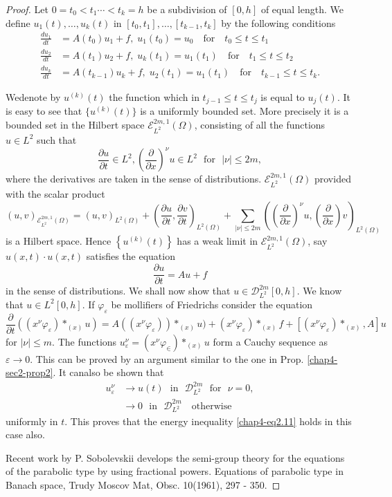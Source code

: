 \begin{proof}
Let $0 = t_0 < t_1 \cdots < t_k = h$ be a subdivision of $[0,h]$ of
equal length. We define $u_1(t), \ldots, u_k(t)$ in $[t_0, t_1],
\ldots, [t_{k-1}, t_k]$ by the following conditions  
\begin{align*}
\frac{du_1}{dt} & = A(t_0) u_1 + f, \; u_1 (t_0) = u_0 \quad \text{for}
\quad t_0 \leq t \leq t_1 \\ 
\frac{du_2}{dt} & = A(t_1) u_2 + f, \; u_k (t_{1}) = u_{1} (t_{1})
\quad \text{for} \quad  t_1 \leq t \leq t_2 \\ 
\frac{du_k}{dt} & = A(t_{k-1}) u_k + f, \; u_2 (t_{1}) = u_{1}
(t_{1})  \quad \text{for} \quad t_{k-1} \leq t \leq t_k.  
\end{align*}

We\pageoriginale denote by $u^{(k)} (t)$ the function which in
$t_{j-1} \leq t \leq t_j$ is equal to $u_j (t)$. It is easy to see that
$\{ u^{(k)} (t)\}$ is a uniformly bounded set. More precisely it is a
bounded set in the Hilbert space $\mathscr{E}^{2m, 1}_{L^2}(\Omega)$,
consisting of all the functions $u \in L^2$ such that
$$
\frac{\partial u}{\partial t} \in L^2,
\left(\frac{\partial}{\partial x}\right)^\nu u \in L^2  \text{~ for~ }
|\nu| \leq 2m,    
$$
where the derivatives are taken in the sense of
distributions. $\mathscr{E}^{2m, 1}_{L^2} (\Omega)$ provided with the
scalar product  
$$
(u, v)_{\mathscr{E}^{ 2m, 1}_{L^2}(\Omega)} = (u, v)_{L^2 (\Omega)} +
\left(\frac{\partial u}{\partial t}, \frac{\partial v}{\partial
  t}\right)_{L^2 (\Omega)} + \sum_{|\nu| \leq 2m}
\left(\left(\frac{\partial}{\partial x}\right)^\nu u,
\left(\frac{\partial}{\partial x}\right) v\right)_{L^2 (\Omega)}  
$$
is a Hilbert space. Hence $\left\{u^{(k)} (t) \right\}$ has a weak
limit in  $\mathscr{E}^{2m, 1}_{L^2}(\Omega)$, say $u(x, t) \cdot u(x,
t)$ satisfies the equation  
\begin{equation*}
\frac{\partial u}{\partial t} = Au + f \tag{2.18}\label{chap4-eq2.18}
\end{equation*}
in the sense of distributions. We shall now show that $u \in
\mathscr{D}^{2m}_{L^2} [0, h]$. We know that $u \in L^2 [0, h
]$. If $\varphi_\varepsilon$ be mollifiers of Friedrichs consider the
equation  
$$
\frac{\partial}{\partial t}((x^\nu \varphi_\varepsilon) *_{(x)}
u) =  A ((x^\nu \varphi_\varepsilon)) *_{(x)}u ) + (x^\nu
\varphi_\varepsilon)  *_{(x)} f + \left[ (x^\nu \varphi_\varepsilon)
  *_{(x)}, A\right]u   
$$
for $|\nu |\leq m$. The functions $u^\nu_\varepsilon = (x^\nu
\varphi_\in)*_{(x)} u$ form a Cauchy sequence as $\varepsilon \to
0$. This can be proved by an argument similar to the one in
Prop. \ref{chap4-sec2-prop2}. It  can\pageoriginale also be shown that  
\begin{align*}
u^\nu_\varepsilon & \to u(t) \text{~ in~ } \mathscr{D}^{2m}_{L^2}
\text{~ for~ } \nu = 0, \\ 
&  \to 0 \text{~ in~ } \mathscr{D}^{2m}_{L^2} \text{~~ otherwise } 
\end{align*}
uniformly in $t$. This proves that the energy inequality \eqref{chap4-eq2.11}
holds in this case also.  

Recent work by P. Sobolevskii develops the semi-group theory for the
equations of the parabolic type by using fractional powers. Equations
of parabolic type in Banach space, Trudy Moscov Mat, Obsc. 10(1961),
297 - 350. 
 \end{proof}
